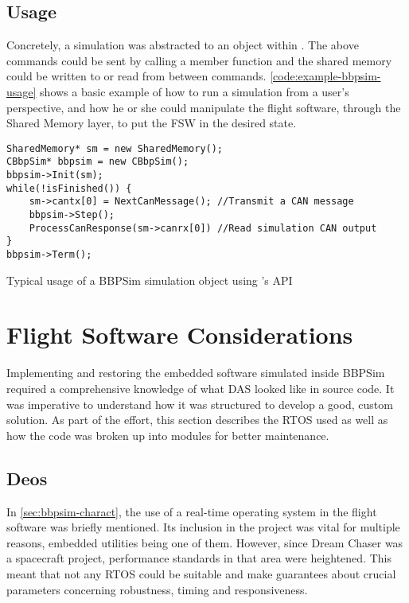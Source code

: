 {\subsection*{Usage}
Concretely, a simulation was abstracted to an object within . The above commands could be sent by calling a member function and the shared memory could be written to or read from between commands.  \autoref{code:example-bbpsim-usage} shows a basic example of how to run a simulation from a user's perspective, and how he or she could manipulate the flight software, through the Shared Memory layer, to put the FSW in the desired state.

\vspace{12pt}
\begin{listing}[H]
	\begin{verbatim}
SharedMemory* sm = new SharedMemory();
CBbpSim* bbpsim = new CBbpSim();
bbpsim->Init(sm);
while(!isFinished()) {
	sm->cantx[0] = NextCanMessage(); //Transmit a CAN message
	bbpsim->Step();
	ProcessCanResponse(sm->canrx[0]) //Read simulation CAN output
}
bbpsim->Term();
	\end{verbatim}
	\caption{Typical usage of a BBPSim simulation object using 's API}
	\label{code:example-bbpsim-usage}
\end{listing}

\section{Flight Software Considerations}\label{sec:fsw-outline}
Implementing and restoring the embedded software simulated inside \gls{BBPSim} required a comprehensive knowledge of what DAS looked like in source code. It was imperative to understand how it was structured to develop a good, custom solution.  As part of the effort, this section describes the RTOS used as well as how the code was broken up into modules for better maintenance.

\subsection*{Deos}
In \autoref{sec:bbpsim-charact}, the use of a real-time operating system in the flight software was briefly mentioned. Its inclusion in the project was vital for multiple reasons, embedded utilities being one of them. However, since Dream Chaser was a spacecraft project, performance standards in that area were heightened. This meant that not any \gls{RTOS} could be suitable and make guarantees about crucial parameters concerning robustness, timing and responsiveness.

}
